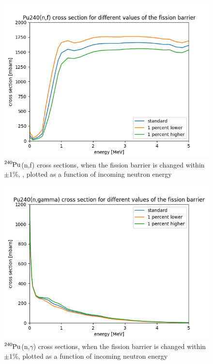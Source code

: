 \documentclass[]{article}
\begin{document}
  \begin{figure} [H]
	\centering
	\includegraphics[scale=0.7]{Fission_cross_section_varying_fission_barrier.png}
	\caption{ $\ce{^{240}Pu}$(n,f) cross sections, when the fission barrier is changed within $\pm 1 \%$, , plotted as a function of incoming neutron energy }
	\label{fig:Fission_cross_section_varying_fission_barrier}
\end{figure}

  \begin{figure} [H]
	\centering
	\includegraphics[scale=0.7]{Gamma_cross_section_varying_fission_barrier.png}
	\caption{ $\ce{^{240}Pu}$(n,$\gamma$) cross sections, when the fission barrier is changed within $\pm 1 \%$, plotted as a function of incoming neutron energy}
	\label{fig:Gamma_cross_section_varying_fission_barrier}
\end{figure}
\end{document}
